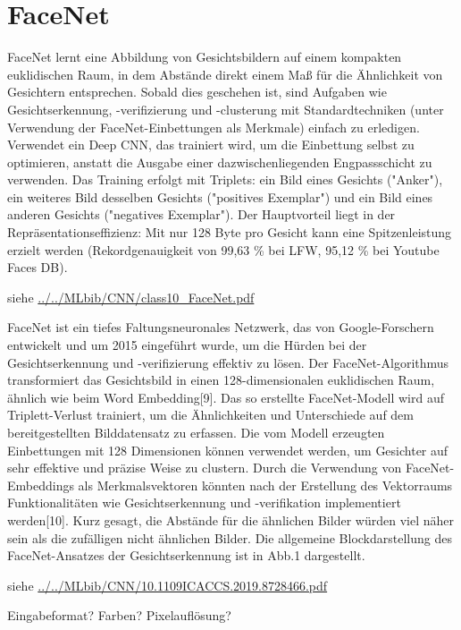%
%


\section{FaceNet}

\cite{Schroff:2015}


FaceNet lernt eine Abbildung von Gesichtsbildern auf einem kompakten euklidischen Raum, in dem Abstände direkt einem Maß für die Ähnlichkeit von Gesichtern entsprechen. Sobald dies geschehen ist, sind Aufgaben wie Gesichtserkennung, -verifizierung und -clusterung mit Standardtechniken (unter Verwendung der FaceNet-Einbettungen als Merkmale) einfach zu erledigen.
Verwendet ein Deep CNN, das trainiert wird, um die Einbettung selbst zu optimieren, anstatt die Ausgabe einer dazwischenliegenden Engpassschicht zu verwenden. Das Training erfolgt mit Triplets: ein Bild eines Gesichts ("Anker"), ein weiteres Bild desselben Gesichts ("positives Exemplar") und ein Bild eines anderen Gesichts ("negatives Exemplar"). Der Hauptvorteil liegt in der Repräsentationseffizienz: Mit nur 128 Byte pro Gesicht kann eine Spitzenleistung erzielt werden (Rekordgenauigkeit von 99,63 \% bei LFW, 95,12 \% bei Youtube Faces DB).

siehe \url{../../MLbib/CNN/class10_FaceNet.pdf}



FaceNet ist ein tiefes Faltungsneuronales Netzwerk, das von Google-Forschern entwickelt und um 2015 eingeführt wurde, um die Hürden bei der Gesichtserkennung und -verifizierung effektiv zu lösen. Der FaceNet-Algorithmus transformiert das Gesichtsbild in einen 128-dimensionalen euklidischen Raum, ähnlich wie beim Word Embedding[9]. Das so erstellte FaceNet-Modell wird auf Triplett-Verlust trainiert, um die Ähnlichkeiten und Unterschiede auf dem bereitgestellten Bilddatensatz zu erfassen. Die vom Modell erzeugten Einbettungen mit 128 Dimensionen können verwendet werden, um Gesichter auf sehr effektive und präzise Weise zu clustern. Durch die Verwendung von FaceNet-Embeddings als Merkmalsvektoren könnten nach der Erstellung des Vektorraums Funktionalitäten wie Gesichtserkennung und -verifikation implementiert werden[10]. Kurz gesagt, die Abstände für die ähnlichen Bilder würden viel näher sein als die zufälligen nicht ähnlichen Bilder. Die allgemeine Blockdarstellung des FaceNet-Ansatzes der Gesichtserkennung ist in Abb.1 dargestellt.

siehe \url{../../MLbib/CNN/10.1109ICACCS.2019.8728466.pdf}

Eingabeformat? Farben? Pixelauflösung?